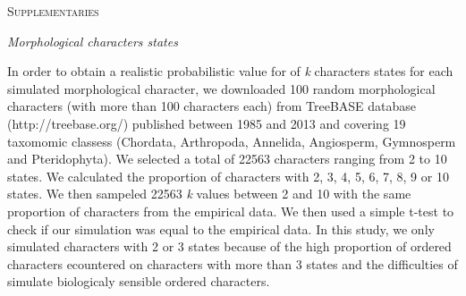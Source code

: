 \documentclass[12pt,letterpaper]{article}
\renewcommand{\section}[1]{%
\bigskip
\begin{center}
\begin{Large}
\normalfont\scshape #1
\medskip
\end{Large}
\end{center}}
\renewcommand{\subsection}[1]{%
\bigskip
\begin{center}
\begin{large}
\normalfont\itshape #1
\end{large}
\end{center}}
\begin{document}


\section{Supplementaries}
\label{supplementaries}
\subsection{Morphological characters states}
In order to obtain a realistic probabilistic value for of \textit{k} characters states for each simulated morphological character, we downloaded 100 random morphological characters (with more than 100 characters each) from TreeBASE database (http://treebase.org/) published between 1985 and 2013 and covering 19 taxomomic classess (Chordata, Arthropoda, Annelida, Angiosperm, Gymnosperm and Pteridophyta).
We selected a total of 22563 characters ranging from 2 to 10 states.
We calculated the proportion of characters with 2, 3, 4, 5, 6, 7, 8, 9 or 10 states.
We then sampeled 22563 \textit{k} values between 2 and 10 with the same proportion of characters from the empirical data.
We then used a simple t-test to check if our simulation was equal to the empirical data.
In this study, we only simulated characters with 2 or 3 states because of the high proportion of ordered characters ecountered on characters with more than 3 states and the difficulties of simulate biologicaly sensible ordered characters.
\end{document}

